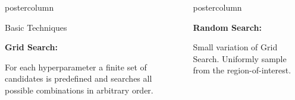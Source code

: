 \documentclass{beamer}
\newlength{\columnheight} %
\begin{document}
\begin{frame}[fragile]{}
\begin{columns}
\begin{column}{.31\textwidth}
\begin{beamercolorbox}[center]{postercolumn}
\begin{minipage}{.98\textwidth}
{\begin{myblock}{Basic Techniques}
  
  \begin{codebox}
  \textbf{Grid Search:}
  \end{codebox}
  For each hyperparameter a finite set of candidates is predefined and searches all possible combinations in arbitrary order.

    \begin{figure}
      \\
    \end{figure}

  \end{myblock}
			}
			\end{minipage}
		\end{beamercolorbox}
	\end{column}

\begin{column}{.31\textwidth}
\begin{beamercolorbox}[center]{postercolumn}
\begin{minipage}{.98\textwidth}
\parbox[t][\columnheight]{\textwidth}{
  
  \begin{myblock}{ }
  
  \begin{codebox}
  \textbf{Random Search:}
  \end{codebox}   
  Small variation of Grid Search. Uniformly sample from the region-of-interest.


\end{myblock}}
\end{minipage}
\end{beamercolorbox}
\end{column}
\end{columns}
\end{frame}
\end{document}
